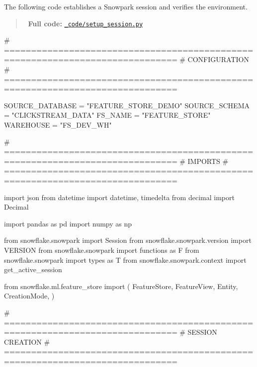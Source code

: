 \documentclass[
  letterpaper,
  DIV=11,
  numbers=noendperiod]{scrreprt}
\newenvironment{Shaded}{\begin{snugshade}}{\end{snugshade}}
\newcommand{\CommentTok}[1]{\textcolor[rgb]{0.37,0.37,0.37}{#1}}
\newcommand{\ImportTok}[1]{\textcolor[rgb]{0.00,0.46,0.62}{#1}}
\newcommand{\NormalTok}[1]{\textcolor[rgb]{0.00,0.23,0.31}{#1}}
\newcommand{\OperatorTok}[1]{\textcolor[rgb]{0.37,0.37,0.37}{#1}}
\newcommand{\StringTok}[1]{\textcolor[rgb]{0.13,0.47,0.30}{#1}}
\begin{document}
The following code establishes a Snowpark session and verifies the
environment.

\begin{quote}
📁 \textbf{Full code:}
\href{_code/setup_session.py}{\texttt{\_code/setup\_session.py}}
\end{quote}

\begin{Shaded}
\begin{Highlighting}[]
\CommentTok{\# ==============================================================================}
\CommentTok{\# CONFIGURATION}
\CommentTok{\# ==============================================================================}

\NormalTok{SOURCE\_DATABASE }\OperatorTok{=} \StringTok{"FEATURE\_STORE\_DEMO"}
\NormalTok{SOURCE\_SCHEMA }\OperatorTok{=} \StringTok{"CLICKSTREAM\_DATA"}
\NormalTok{FS\_NAME }\OperatorTok{=} \StringTok{"FEATURE\_STORE"}
\NormalTok{WAREHOUSE }\OperatorTok{=} \StringTok{"FS\_DEV\_WH"}

\CommentTok{\# ==============================================================================}
\CommentTok{\# IMPORTS}
\CommentTok{\# ==============================================================================}

\ImportTok{import}\NormalTok{ json}
\ImportTok{from}\NormalTok{ datetime }\ImportTok{import}\NormalTok{ datetime, timedelta}
\ImportTok{from}\NormalTok{ decimal }\ImportTok{import}\NormalTok{ Decimal}

\ImportTok{import}\NormalTok{ pandas }\ImportTok{as}\NormalTok{ pd}
\ImportTok{import}\NormalTok{ numpy }\ImportTok{as}\NormalTok{ np}

\ImportTok{from}\NormalTok{ snowflake.snowpark }\ImportTok{import}\NormalTok{ Session}
\ImportTok{from}\NormalTok{ snowflake.snowpark.version }\ImportTok{import}\NormalTok{ VERSION}
\ImportTok{from}\NormalTok{ snowflake.snowpark }\ImportTok{import}\NormalTok{ functions }\ImportTok{as}\NormalTok{ F}
\ImportTok{from}\NormalTok{ snowflake.snowpark }\ImportTok{import}\NormalTok{ types }\ImportTok{as}\NormalTok{ T}
\ImportTok{from}\NormalTok{ snowflake.snowpark.context }\ImportTok{import}\NormalTok{ get\_active\_session}

\ImportTok{from}\NormalTok{ snowflake.ml.feature\_store }\ImportTok{import}\NormalTok{ (}
\NormalTok{    FeatureStore, }
\NormalTok{    FeatureView, }
\NormalTok{    Entity,}
\NormalTok{    CreationMode,}
\NormalTok{)}

\CommentTok{\# ==============================================================================}
\CommentTok{\# SESSION CREATION}
\CommentTok{\# ==============================================================================}


\end{Highlighting}
\end{Shaded}
\end{document}
